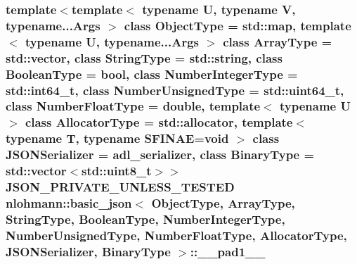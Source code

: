 \subsubsection[{\texorpdfstring{\+\_\+\+\_\+pad1\+\_\+\+\_\+}{__pad1__}}]{\setlength{\rightskip}{0pt plus 5cm}template$<$template$<$ typename U, typename V, typename...\+Args $>$ class Object\+Type = std\+::map, template$<$ typename U, typename...\+Args $>$ class Array\+Type = std\+::vector, class String\+Type  = std\+::string, class Boolean\+Type  = bool, class Number\+Integer\+Type  = std\+::int64\+\_\+t, class Number\+Unsigned\+Type  = std\+::uint64\+\_\+t, class Number\+Float\+Type  = double, template$<$ typename U $>$ class Allocator\+Type = std\+::allocator, template$<$ typename T, typename S\+F\+I\+N\+A\+E=void $>$ class J\+S\+O\+N\+Serializer = adl\+\_\+serializer, class Binary\+Type  = std\+::vector$<$std\+::uint8\+\_\+t$>$$>$ {\bf J\+S\+O\+N\+\_\+\+P\+R\+I\+V\+A\+T\+E\+\_\+\+U\+N\+L\+E\+S\+S\+\_\+\+T\+E\+S\+T\+ED} {\bf nlohmann\+::basic\+\_\+json}$<$ Object\+Type, Array\+Type, String\+Type, Boolean\+Type, Number\+Integer\+Type, Number\+Unsigned\+Type, Number\+Float\+Type, Allocator\+Type, J\+S\+O\+N\+Serializer, Binary\+Type $>$\+::\+\_\+\+\_\+pad1\+\_\+\+\_\+\hspace{0.3cm}{\ttfamily [private]}}\hypertarget{classnlohmann_1_1basic__json_a834674252ca19c65b24963d28eb8932d}{}\label{classnlohmann_1_1basic__json_a834674252ca19c65b24963d28eb8932d}
